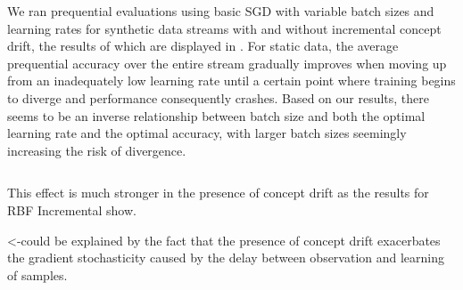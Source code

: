 \documentclass[letterpaper]{article} %
\begin{document}
We ran prequential evaluations using basic SGD with variable batch sizes and learning rates for synthetic data streams with and without incremental concept drift, the results of which are displayed in . For static data, the average prequential accuracy over the entire stream gradually improves when moving up from an inadequately low learning rate until a certain point where training begins to diverge and performance consequently crashes. Based on our results, there seems to be an inverse relationship between batch size and both the optimal learning rate and the optimal accuracy, with larger batch sizes seemingly increasing the risk of divergence.


\begin{equation}
\end{equation}


This effect is much stronger in the presence of concept drift as the results for RBF Incremental show.

<-could be explained by the fact that the presence of concept drift exacerbates the gradient stochasticity caused by the delay between observation and learning of samples.
\end{document}
